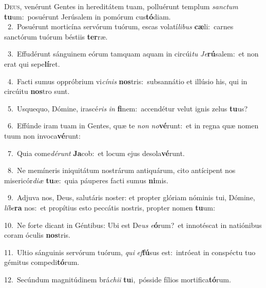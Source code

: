 \lettrine{\initial\textcolor{\initialcolor}{D}}{eus,} venérunt Gentes in hereditátem tuam, polluérunt templum \textit{sanc}\-\textit{tum} \textbf{tu}\-um:~\star posuérunt Jerúsalem in pomórum cus\-\textbf{tó}\-diam.\\
{\numbfont\textcolor{\numbcolor}{~2.}}~Posuérunt morticína servórum tuórum, escas volatí\-\textit{li}\-\textit{bus} \textbf{cæ}\-li:~\star carnes sanctórum tuórum béstiis \textbf{ter}\-ræ.\par
{\numbfont\textcolor{\numbcolor}{~3.}}~Effudérunt sánguinem eórum tamquam aquam in circúi\textit{tu} \textit{Je}\-\textbf{rú}salem:~\star et non erat qui sepe\-\textbf{lí}\-ret.\par
{\numbfont\textcolor{\numbcolor}{~4.}}~Facti sumus oppróbrium vi\-\textit{cí}\-\textit{nis} \textbf{nos}\-tris:~\star subsannátio et illúsio his, qui in circúitu \textbf{nos}\-tro sunt.\par
{\numbfont\textcolor{\numbcolor}{~5.}}~Usquequo, Dómine, irascé\textit{ris} \textit{in} \textbf{fi}\-nem:~\star accendétur velut ignis zelus \textbf{tu}\-us?\par
{\numbfont\textcolor{\numbcolor}{~6.}}~Effúnde iram tuam in Gentes, quæ te \textit{non} \textit{no}\-\textbf{vé}runt:~\star et in regna quæ nomen tuum non invoca\-\textbf{vé}\-runt:\par
{\numbfont\textcolor{\numbcolor}{~7.}}~Quia come\-\textit{dé}\-\textit{runt} \textbf{Ja}\-cob:~\star et locum ejus desola\-\textbf{vé}\-runt.\par
{\numbfont\textcolor{\numbcolor}{~8.}}~Ne memíneris iniquitátum nostrárum antiquárum, cito antícipent nos misericór\-\textit{di}\-\textit{æ} \textbf{tu}\-æ:~\star quia páuperes facti sumus \textbf{ni}\-mis.\par
{\numbfont\textcolor{\numbcolor}{~9.}}~Adjuva nos, Deus, salutáris noster: et propter glóriam nóminis tui, Dómine, \textit{lí}\-\textit{be}\textbf{ra} nos:~\star et propítius esto peccátis nostris, propter nomen \textbf{tu}\-um:\par
{\numbfont\textcolor{\numbcolor}{10.}}~Ne forte dicant in Géntibus: Ubi est De\textit{us} \textit{e}\-\textbf{ó}rum?~\star et innotéscat in natiónibus coram óculis \textbf{nos}\-tris.\par
{\numbfont\textcolor{\numbcolor}{11.}}~Ultio sánguinis servórum tuórum, \textit{qui} \textit{ef}\-\textbf{fú}sus est:~\star intróeat in conspéctu tuo gémitus compedi\-\textbf{tó}\-rum.\par
{\numbfont\textcolor{\numbcolor}{12.}}~Secúndum magnitúdinem brá\-\textit{chi}\-\textit{i} \textbf{tu}\-i,~\star pósside fílios mortifica\-\textbf{tó}\-rum.\par
